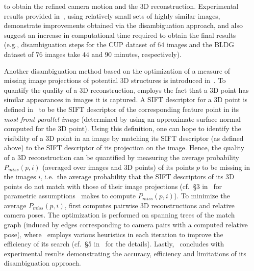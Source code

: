 \documentclass[10pt]{article}
\begin{document}
to obtain the refined camera motion and the $3$D reconstruction. Experimental results provided in~\cite{RobertsDuplicates}, using relatively small sets of highly similar images, demonstrate improvements obtained via the disambiguation approach, and also suggest an increase in computational time required to obtain the final results (e.g., disambiguation steps for the CUP dataset of $64$ images and the BLDG dataset of $76$ images take $44$ and $90$ minutes, respectively). 

Another disambiguation method based on the optimization of a measure of missing image projections of potential $3$D structures is introduced in~\cite{SeeingDouble}. To quantify the quality of a $3$D reconstruction, \cite{SeeingDouble} employs the fact that a $3$D point has similar appearances in images it is captured. A SIFT descriptor for a $3$D point is defined in~\cite{SeeingDouble} to be the SIFT descriptor of the corresponding feature point in its \textit{most front parallel image} (determined by using an approximate surface normal computed for the $3$D point). Using this definition, one can hope to identify the visibility of a $3$D point in an image by matching its SIFT descriptor (as defined above) to the SIFT descriptor of its projection on the image. Hence, the quality of a $3$D reconstruction can be quantified by measuring the average probability $P_{miss}(p,i)$ (averaged over images and $3$D points) of its points $p$ to be missing in the images $i$, i.e.~the average probability that the SIFT descriptors of its $3$D points do not match with those of their image projections (cf.~\S3 in~\cite{SeeingDouble} for parametric assumptions~\cite{SeeingDouble} makes to compute $P_{miss}(p,i)$). To minimize the average $P_{miss}(p,i)$, \cite{SeeingDouble} first computes pairwise $3$D reconstructions and relative camera poses. The optimization is performed on spanning trees of the match graph (induced by edges corresponding to camera pairs with a computed relative pose), where~\cite{SeeingDouble} employs various heuristics in each iteration to improve the efficiency of its search (cf.~\S5 in~\cite{SeeingDouble} for the details). Lastly,~\cite{SeeingDouble} concludes with experimental results demonstrating the accuracy, efficiency and limitations of its disambiguation approach. 
\end{document}
